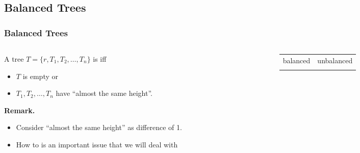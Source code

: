 \documentclass[10pt]{beamer}
\begin{document}
\subsection{Balanced Trees}
\begin{frame}[t]\frametitle{Balanced Trees}
	\begin{columns}[T] %
	\begin{column}{.5\linewidth} %
		\begin{definition}
			 A tree $T = \{ r, T_{1}, T_{2}, \ldots, T_{n} \}$ is  
			 iff
			\begin{itemize}
			
				\item
				$T$ is empty or
			
				\item
				$T_{1}, T_{2}, \ldots, T_{n}$ have ``almost the same height''.
			\end{itemize}		 
		\end{definition}
		
		\textbf{Remark.}
		\begin{itemize}
			
			\item 
			Consider ``almost the same height'' as difference of 1.

			\item			
			How to  is an important issue that 
			we will deal with

		\end{itemize}
		
	\end{column} %
	\begin{column}{.5\linewidth} %
		\begin{example}
		{\scriptsize
			\begin{tabular}{c c}
			balanced
			& unbalanced
			\\
			
			&
			\\
			\end{tabular}
		} %
		\end{example}
	\end{column} %
	\end{columns} %
\end{frame}
\end{document}
